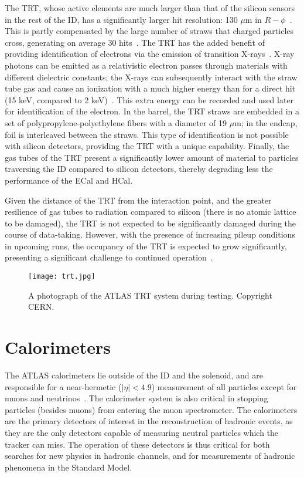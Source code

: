The TRT, whose active elements are much larger than that of the silicon sensors in the rest of the ID, has a significantly larger hit resolution: 130 $\mu$m in $R-\phi$~\cite{ATLASPaper}. This is partly compensated by the large number of straws that charged particles cross, generating on average 30 hits~\cite{ATLASExpected}. The TRT has the added benefit of providing identification of electrons via the emission of transition X-rays~\cite{TRTPID}. X-ray photons can be emitted as a relativistic electron passes through materials with different dielectric constants; the X-rays can subsequently interact with the straw tube gas and cause an ionization with a much higher energy than for a direct hit (15 keV, compared to 2 keV)~\cite{TRTReadout}. This extra energy can be recorded and used later for identification of the electron. In the barrel, the TRT straws are embedded in a set of polypropylene-polyethylene fibers with a diameter of 19 $\mu$m; in the endcap, foil is interleaved between the straws. This type of identification is not possible with silicon detectors, providing the TRT with a unique capability. Finally, the gas tubes of the TRT present a significantly lower amount of material to particles traversing the ID compared to silicon detectors, thereby degrading less the performance of the ECal and HCal.

Given the distance of the TRT from the interaction point, and the greater resilience of gas tubes to radiation compared to silicon (there is no atomic lattice to be damaged), the TRT is not expected to be significantly damaged during the course of data-taking. However, with the presence of increasing pileup conditions in upcoming runs, the occupancy of the TRT is expected to grow significantly, presenting a significant challenge to continued operation~\cite{TRTOccupancy}.


\begin{figure}
\centering
\texttt{[image: trt.jpg]}
\label{fig:detector:trt}
\caption{A photograph of the ATLAS TRT system during testing. Copyright CERN.}
\end{figure}


\section{Calorimeters}

The ATLAS calorimeters lie outside of the ID and the solenoid, and are responsible for a near-hermetic ($|\eta| < 4.9$) measurement of all particles except for muons and neutrinos~\cite{ATLASPaper}.  The calorimeter system is also critical in stopping particles (besides muons) from entering the muon spectrometer. The calorimeters are the primary detectors of interest in the reconstruction of hadronic events, as they are the only detectors capable of measuring neutral particles which the tracker can miss. The operation of these detectors is thus critical for both searches for new physics in hadronic channels, and for measurements of hadronic phenomena in the Standard Model.

